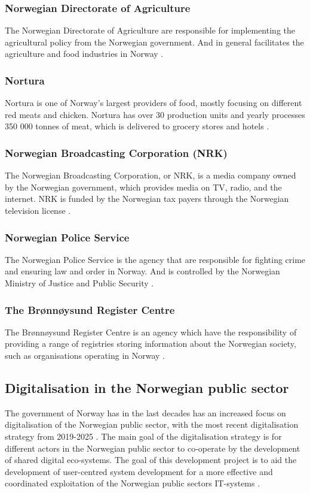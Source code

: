 \subsubsection{Norwegian Directorate of Agriculture}
The Norwegian Directorate of Agriculture are responsible for implementing the agricultural policy from the Norwegian government. And in general facilitates the agriculture and food industries in Norway \cite{landbruksdirektoratet_2023}.

\subsubsection{Nortura}
Nortura is one of Norway's largest providers of food, mostly focusing on different red meats and chicken. Nortura has over 30 production units and yearly processes 350 000 tonnes of meat, which is delivered to grocery stores and hotels \cite{nortura_2023}.

\subsubsection{Norwegian Broadcasting Corporation (NRK)}
The Norwegian Broadcasting Corporation, or NRK, is a media company owned by the Norwegian government, which provides media on TV, radio, and the internet. NRK is funded by the Norwegian tax payers through the Norwegian television license \cite{nrk_wiki_2023}.

\subsubsection{Norwegian Police Service}
The Norwegian Police Service is the agency that are responsible for fighting crime and ensuring law and order in Norway. And is controlled by the Norwegian Ministry of Justice and Public Security \cite{politiet_wiki_2023}.

\subsubsection{The Brønnøysund Register Centre}
The Brønnøysund Register Centre is an agency which have the responsibility of providing a range of registries storing information about the Norwegian society, such as organisations operating in Norway \cite{brønnøysundregistrene_wiki_2023}.

\subsection{Digitalisation in the Norwegian public sector}
The government of Norway has in the last decades has an increased focus on digitalisation of the Norwegian public sector, with the most recent digitalisation strategy from 2019-2025 \cite{r_2019}. The main goal of the digitalisation strategy is for different actors in the Norwegian public sector to co-operate by the development of shared digital eco-systems. The goal of this development project is to aid the development of user-centred system development for a more effective and coordinated exploitation of the Norwegian public sectors IT-systems \cite{r_2019}.

